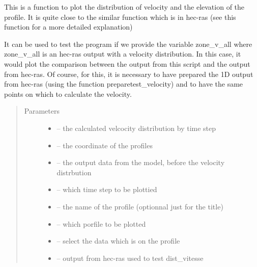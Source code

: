 \documentclass[letterpaper,10pt,english]{sphinxmanual}
\begin{document}
\begin{fulllineitems}
\label{\detokenize{index:src.dist_vistess2.plot_dist_vit}}
This is a function to plot the distribution of velocity and the elevation of the profile. It is quite close to the
similar function which is in hec-ras (see this function for a more detailed explanation)

It can be used to test the program if we provide the variable zone\_v\_all where zone\_v\_all is an hec-ras output with a
velocity distribution. In this case, it would plot the comparison between the output from this script and the
output from hec-ras. Of course, for this, it is necessary to have prepared the 1D output from hec-ras
(using the function preparetest\_velocity) and to have the same points on which to calculate the velocity.
\begin{quote}\begin{description}
\item[{Parameters}] \leavevmode\begin{itemize}
\item {} 
 -- the calculated velcocity distribution by time step

\item {} 
 -- the coordinate of the profiles

\item {} 
 -- the output data from the model, before the velocity distrbution

\item {} 
 -- which time step to be plottied

\item {} 
 -- the name of the profile (optionnal just for the title)

\item {} 
 -- which porfile to be plotted

\item {} 
 -- select the data which is on the profile

\item {} 
 -- output from hec-ras used to test dist\_vitesse


\end{itemize}
\end{description}
\end{quote}
\end{fulllineitems}
\end{document}
